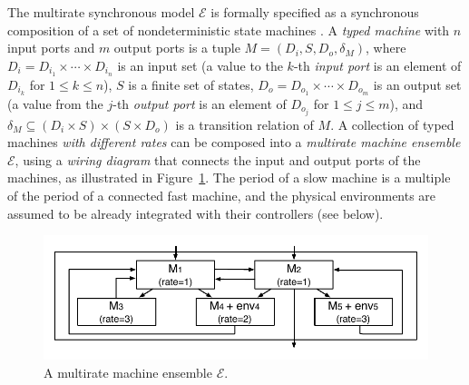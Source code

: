 \documentclass{sig-alternate}
\begin{document}
The multirate synchronous model $\mathcal{E}$ 
is formally specified as
a synchronous composition of a set of  nondeterministic state machines \cite{pals-tcs}.
%
A \emph{typed machine} with $n$ input ports and $m$ output ports
is a tuple $M = (D_i,S,D_o,\delta_M)$,
where
$D_i = D_{i_1} \times \cdots \times D_{i_n}$ is an input set 
(a value to the $k$-th \emph{input port}  is an element of $D_{i_k}$ for $1 \leq k \leq n$), %
$S$ is a finite set of states,
$D_o =D_{o_1} \times \cdots \times D_{o_m}$ is an output set
(a value from the $j$-th \emph{output port} is an element of $D_{o_j}$ for $1 \leq j \leq m$), %
and
$\delta_M \subseteq (D_i \times S) \times (S \times D_o)$ is a %
transition relation of $M$.
A collection of typed machines \emph{with different rates}
can be composed into a \emph{multirate machine ensemble} $\mathcal{E}$,
using  a \emph{wiring diagram} that connects  the input and output ports of the machines,
as illustrated in Figure~\ref{fig:ensemble}.
The period of a slow machine is a multiple of the period of a connected fast machine,
and the physical environments are 
assumed to be already integrated with their controllers (see below).


\begin{figure}
\centering
\includegraphics[clip=true,trim=0.3cm 0.4cm 0.3cm 0.4cm,width=1.0\columnwidth]{ensemble.pdf}    
\caption{A multirate machine ensemble $\mathcal{E}$.
}  \label{fig:ensemble}
\end{figure}
\end{document}
